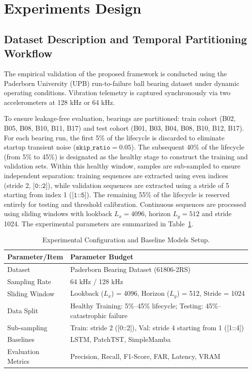 \documentclass[runningheads]{llncs}
\begin{document}
\section{Experiments Design} \label{sect:s4}

\subsection{Dataset Description and Temporal Partitioning Workflow} \label{sect:s4dot1}
The empirical validation of the proposed framework is conducted using the Paderborn University (UPB) run-to-failure ball bearing dataset under dynamic operating conditions. Vibration telemetry is captured synchronously via two accelerometers at 128 kHz or 64 kHz.

To ensure leakage-free evaluation, bearings are partitioned: train cohort (B02, B05, B08, B10, B11, B17) and test cohort (B01, B03, B04, B08, B10, B12, B17). For each bearing run, the first 5\% of the lifecycle is discarded to eliminate startup transient noise ($\texttt{skip\_ratio} = 0.05$). The subsequent 40\% of the lifecycle (from 5\% to 45\%) is designated as the healthy stage to construct the training and validation sets. Within this healthy window, samples are sub-sampled to ensure independent separation: training sequences are extracted using even indices (stride 2, $\texttt{[0::2]}$), while validation sequences are extracted using a stride of 5 starting from index 1 ($\texttt{[1::5]}$). The remaining 55\% of the lifecycle is reserved entirely for testing and threshold calibration. Continuous sequences are processed using sliding windows with lookback $L_x = 4096$, horizon $L_y = 512$ and stride 1024. The experimental parameters are summarized in Table~\ref{tabref:table-3}.

\begin{table}[htbp]
\caption{Experimental Configuration and Baseline Models Setup.}
\label{tabref:table-3}
\centering
\footnotesize
\begin{tabular}{|p{3.5cm}|p{8.2cm}|}
\hline
\textbf{Parameter/Item} & \textbf{Parameter Budget} \\ \hline
Dataset & Paderborn Bearing Dataset (61806-2RS) \\ \hline
Sampling Rate & 64 kHz / 128 kHz \\ \hline
Sliding Window & Lookback ($L_x$) = 4096, Horizon ($L_y$) = 512, Stride = 1024 \\ \hline
Data Split & Healthy Training: 5\%–45\% lifecycle; Testing: 45\%--catastrophic failure \\ \hline
Sub-sampling & Train: stride 2 ([0::2]), Val: stride 4 starting from 1 ([1::4]) \\ \hline
Baselines & LSTM, PatchTST, SimpleMamba \\ \hline
Evaluation Metrics & Precision, Recall, F1-Score, FAR, Latency, VRAM \\ \hline
\end{tabular}
\end{table}
\end{document}
